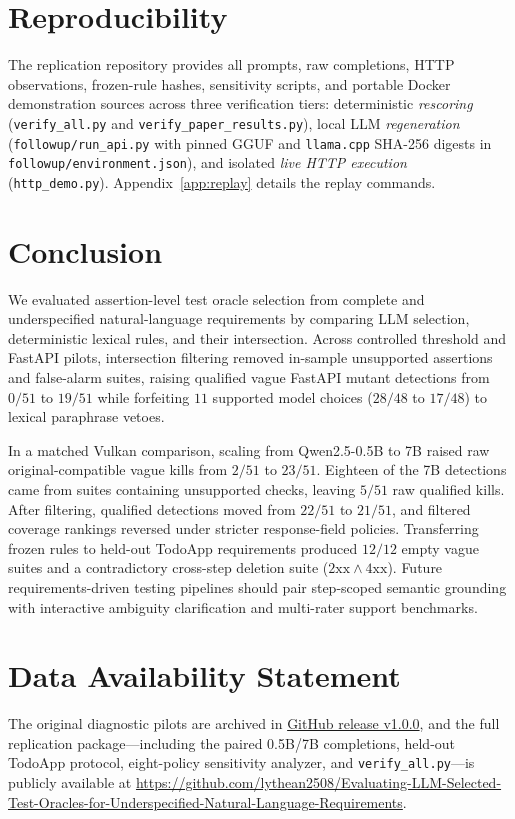 \documentclass[sigconf,nonacm]{acmart}
\begin{document}
\section{Reproducibility}
The replication repository provides all prompts, raw completions, HTTP observations, frozen-rule hashes, sensitivity scripts, and portable Docker demonstration sources across three verification tiers: deterministic \emph{rescoring} (\nolinkurl{verify_all.py} and \nolinkurl{verify_paper_results.py}), local LLM \emph{regeneration} (\nolinkurl{followup/run_api.py} with pinned GGUF and \texttt{llama.cpp} SHA-256 digests in \nolinkurl{followup/environment.json}), and isolated \emph{live HTTP execution} (\nolinkurl{http_demo.py}). Appendix~\ref{app:replay} details the replay commands.

\section{Conclusion}
We evaluated assertion-level test oracle selection from complete and underspecified natural-language requirements by comparing LLM selection, deterministic lexical rules, and their intersection. Across controlled threshold and FastAPI pilots, intersection filtering removed in-sample unsupported assertions and false-alarm suites, raising qualified vague FastAPI mutant detections from $0/51$ to $19/51$ while forfeiting $11$ supported model choices ($28/48$ to $17/48$) to lexical paraphrase vetoes.

In a matched Vulkan comparison, scaling from Qwen2.5-0.5B to 7B raised raw original-compatible vague kills from $2/51$ to $23/51$. Eighteen of the 7B detections came from suites containing unsupported checks, leaving $5/51$ raw qualified kills. After filtering, qualified detections moved from $22/51$ to $21/51$, and filtered coverage rankings reversed under stricter response-field policies. Transferring frozen rules to held-out TodoApp requirements produced $12/12$ empty vague suites and a contradictory cross-step deletion suite ($2\text{xx}\wedge 4\text{xx}$). Future requirements-driven testing pipelines should pair step-scoped semantic grounding with interactive ambiguity clarification and multi-rater support benchmarks.

\section*{Data Availability Statement}
The original diagnostic pilots are archived in \href{https://github.com/lythean2508/Evaluating-LLM-Selected-Test-Oracles-for-Underspecified-Natural-Language-Requirements/releases/tag/v1.0.0}{GitHub release v1.0.0}, and the full replication package---including the paired 0.5B/7B completions, held-out TodoApp protocol, eight-policy sensitivity analyzer, and \texttt{verify\_all.py}---is publicly available at \url{https://github.com/lythean2508/Evaluating-LLM-Selected-Test-Oracles-for-Underspecified-Natural-Language-Requirements}.
\end{document}
